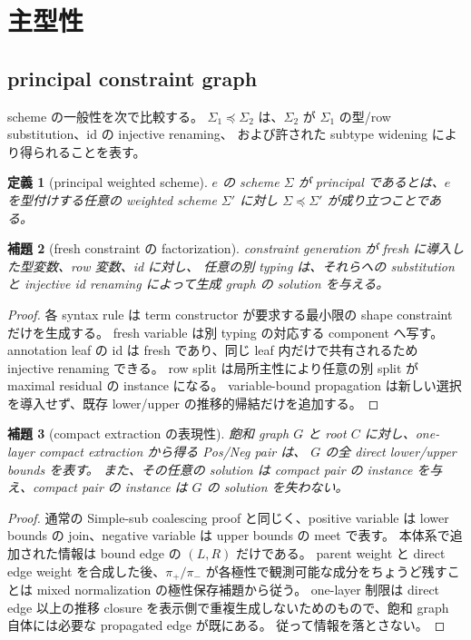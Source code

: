 \documentclass[uplatex,dvipdfmx,a4paper,10.5pt]{jsarticle}
\theoremstyle{jpplain}
\newtheorem{definition}{定義}[section]
\newtheorem{lemma}[definition]{補題}
\newcommand{\projp}{\pi_{+}}
\newcommand{\projn}{\pi_{-}}
\begin{document}
\section{主型性}

\subsection{principal constraint graph}

scheme の一般性を次で比較する。
$\Sigma_1\preceq\Sigma_2$ は、$\Sigma_2$ が $\Sigma_1$ の型/row substitution、id の injective renaming、
および許された subtype widening により得られることを表す。

\begin{definition}[principal weighted scheme]
$e$ の scheme $\Sigma$ が principal であるとは、$e$ を型付けする任意の weighted scheme $\Sigma'$ に対し
$\Sigma\preceq\Sigma'$ が成り立つことである。
\end{definition}

\begin{lemma}[fresh constraint の factorization]
constraint generation が fresh に導入した型変数、row 変数、id に対し、
任意の別 typing は、それらへの substitution と injective id renaming によって生成 graph の solution を与える。
\end{lemma}

\begin{proof}
各 syntax rule は term constructor が要求する最小限の shape constraint だけを生成する。
fresh variable は別 typing の対応する component へ写す。
annotation leaf の id は fresh であり、同じ leaf 内だけで共有されるため injective renaming できる。
row split は局所主性により任意の別 split が maximal residual の instance になる。
variable-bound propagation は新しい選択を導入せず、既存 lower/upper の推移的帰結だけを追加する。
\end{proof}

\begin{lemma}[compact extraction の表現性]
飽和 graph $G$ と root $C$ に対し、one-layer compact extraction から得る Pos/Neg pair は、
$G$ の全 direct lower/upper bounds を表す。
また、その任意の solution は compact pair の instance を与え、compact pair の instance は $G$ の solution を失わない。
\end{lemma}

\begin{proof}
通常の Simple-sub coalescing proof と同じく、positive variable は lower bounds の join、negative variable は upper bounds の meet で表す。
本体系で追加された情報は bound edge の $(L,R)$ だけである。
parent weight と direct edge weight を合成した後、$\projp/\projn$ が各極性で観測可能な成分をちょうど残すことは mixed normalization の極性保存補題から従う。
one-layer 制限は direct edge 以上の推移 closure を表示側で重複生成しないためのもので、飽和 graph 自体には必要な propagated edge が既にある。
従って情報を落とさない。
\end{proof}
\end{document}

